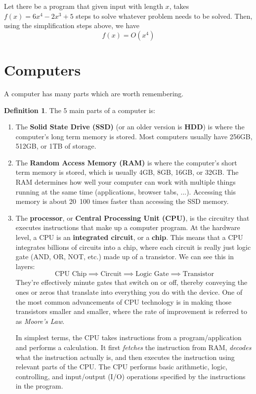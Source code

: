 \documentclass[a4paper, 12pt]{report}
\theoremstyle{remark}
\theoremstyle{definition}
\newtheorem{definition}{Definition}[section]
\begin{document}
\begin{example}
Let there be a program that given input with length $x$, takes $f(x) = 6x^4 - 2x^3 + 5$ steps to solve whatever problem needs to be solved. Then, using the simplification steps above, we have 
\[f(x) = O(x^4)\]
\end{example}

\section{Computers}
A computer has many parts which are worth remembering. 

\begin{definition}
The 5 main parts of a computer is: 
\begin{enumerate}
    \item The \textbf{Solid State Drive (SSD)} (or an older version is \textbf{HDD}) is where the computer's long term memory is stored. Most computers usually have 256GB, 512GB, or 1TB of storage. 
    
    \item The \textbf{Random Access Memory (RAM)} is where the computer's short term memory is stored, which is usually 4GB, 8GB, 16GB, or 32GB. The RAM determines how well your computer can work with multiple things running at the same time (applications, browser tabs, ...). Accessing this memory is about 20~100 times faster than accessing the SSD memory. 
    
    \item The \textbf{processor}, or \textbf{Central Processing Unit (CPU)}, is the circuitry that executes instructions that make up a computer program. At the hardware level, a CPU is an \textbf{integrated circuit}, or a \textbf{chip}. This means that a CPU integrates billions of circuits into a chip, where each circuit is really just logic gate (AND, OR, NOT, etc.) made up of a transistor. We can see this in layers: 
    \[\text{CPU Chip} \implies \text{Circuit} \implies \text{Logic Gate} \implies \text{Transistor}\]
    They’re effectively minute gates that switch on or off, thereby conveying the ones or zeros that translate into everything you do with the device. One of the most common advancements of CPU technology is in making those transistors smaller and smaller, where the rate of improvement is referred to as \textit{Moore's Law}. 
    
    In simplest terms, the CPU takes instructions from a program/application and performs a calculation. It first \textit{fetches} the instruction from RAM, \textit{decodes} what the instruction actually is, and then executes the instruction using relevant parts of the CPU. The CPU performs basic arithmetic, logic, controlling, and input/output (I/O) operations specified by the instructions in the program. 
    

\end{enumerate}
\end{definition}
\end{document}

